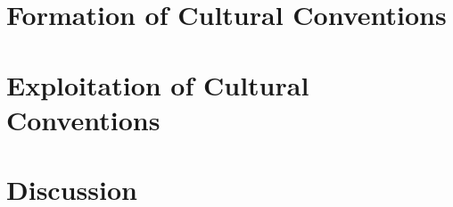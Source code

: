 \documentclass[a4paper,11pt,twoside,openany,final,openbib]{memoir} %
\begin{document}
\fontsize{10.5pt}{13.5pt}\selectfont %


\maketitle


\frontmatter

% 
\clearpage

\dominitoc
\tableofcontents





\printglossaries



\mainmatter




\part{Formation of Cultural Conventions}
\label{part:formation}





\part{Exploitation of Cultural Conventions}
\label{part:exploitation}




\part{Discussion}





\appendixpage
\appendix






\backmatter

\clearpage



\end{document}
